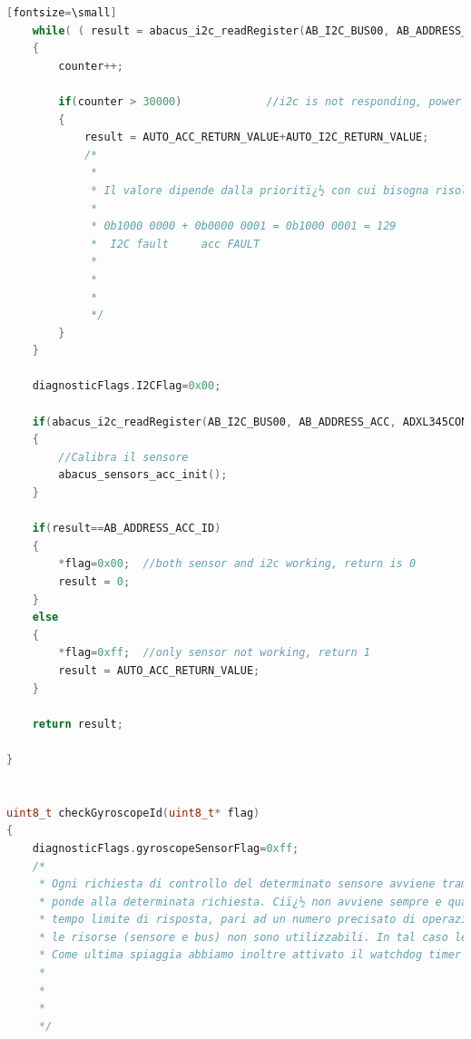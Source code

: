 \documentclass[LaM,binding=0.6cm]{../sapthesis}
\begin{document}
\begin{lstlisting}[language=c][fontsize=\small]
    while( ( result = abacus_i2c_readRegister(AB_I2C_BUS00, AB_ADDRESS_ACC, ADXL345DEVID) ) == 0x00)
    {
        counter++;

        if(counter > 30000)             //i2c is not responding, power reset, so i both acc and i2c not working to be sure
        {
            result = AUTO_ACC_RETURN_VALUE+AUTO_I2C_RETURN_VALUE;
            /*
             *
             * Il valore dipende dalla prioritï¿½ con cui bisogna risolvere il problema: questo identifica che sia il bus IC che l'accelerometro sono non funzionanti:
             *
             * 0b1000 0000 + 0b0000 0001 = 0b1000 0001 = 129
             *  I2C fault     acc FAULT
             *
             *
             *
             */
        }
    }

    diagnosticFlags.I2CFlag=0x00;

    if(abacus_i2c_readRegister(AB_I2C_BUS00, AB_ADDRESS_ACC, ADXL345CONFIGREG)!=ADXL345_STD_CONFIG)
    {
        //Calibra il sensore
        abacus_sensors_acc_init();
    }

    if(result==AB_ADDRESS_ACC_ID)
    {
        *flag=0x00;  //both sensor and i2c working, return is 0
        result = 0;
    }
    else
    {
        *flag=0xff;  //only sensor not working, return 1
        result = AUTO_ACC_RETURN_VALUE;
    }

    return result;

}


uint8_t checkGyroscopeId(uint8_t* flag)
{
    diagnosticFlags.gyroscopeSensorFlag=0xff;
    /*
     * Ogni richiesta di controllo del determinato sensore avviene tramite protocollo I2C. Questo protocollo si svolge in due parti: prima si richiede la determinata risorsa, poi il sensore ris
     * ponde alla determinata richiesta. Ciï¿½ non avviene sempre e qualcosa puï¿½ andare storto (sensore rotto, bus I2C non funzionante). Per evitare che il codice si blocchi imponiamo quindi un
     * tempo limite di risposta, pari ad un numero precisato di operazioni. Se il contatore raggiunge il limite, significa che il bus non risponde e di conseguenza bisogna supporre che entrambe
     * le risorse (sensore e bus) non sono utilizzabili. In tal caso le flag a byte rimangono alte e dopo un software reset obbligato le risorse vengono escluse o il problema viene risolto.
     * Come ultima spiaggia abbiamo inoltre attivato il watchdog timer che ci permette di non bloccare il codice nel caso in cui tutta la procedura venga bloccata da un evento inaspettato.
     *
     *
     *
     */



\end{lstlisting}
\end{document}
